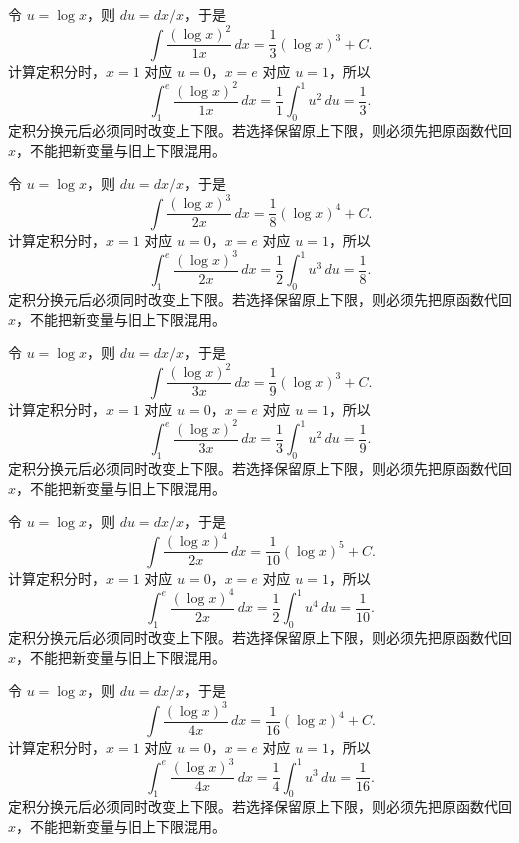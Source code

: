 \documentclass[UTF8,12pt,a4paper,fontset=fandol]{ctexart}
\begin{document}
\begin{solve}\label{ans:c12q19}
令 $u=\log x$，则 $du=dx/x$，于是
\[
\int\frac{(\log x)^{2}}{1x}\,dx=\frac{1}{3}(\log x)^{3}+C.
\]
计算定积分时，$x=1$ 对应 $u=0$，$x=e$ 对应 $u=1$，所以
\[
\int_1^e\frac{(\log x)^{2}}{1x}\,dx=\frac1{1}\int_0^1u^{2}\,du=\frac{1}{3}.
\]
定积分换元后必须同时改变上下限。若选择保留原上下限，则必须先把原函数代回 $x$，不能把新变量与旧上下限混用。
\end{solve}

\begin{solve}\label{ans:c12q20}
令 $u=\log x$，则 $du=dx/x$，于是
\[
\int\frac{(\log x)^{3}}{2x}\,dx=\frac{1}{8}(\log x)^{4}+C.
\]
计算定积分时，$x=1$ 对应 $u=0$，$x=e$ 对应 $u=1$，所以
\[
\int_1^e\frac{(\log x)^{3}}{2x}\,dx=\frac1{2}\int_0^1u^{3}\,du=\frac{1}{8}.
\]
定积分换元后必须同时改变上下限。若选择保留原上下限，则必须先把原函数代回 $x$，不能把新变量与旧上下限混用。
\end{solve}

\begin{solve}\label{ans:c12q21}
令 $u=\log x$，则 $du=dx/x$，于是
\[
\int\frac{(\log x)^{2}}{3x}\,dx=\frac{1}{9}(\log x)^{3}+C.
\]
计算定积分时，$x=1$ 对应 $u=0$，$x=e$ 对应 $u=1$，所以
\[
\int_1^e\frac{(\log x)^{2}}{3x}\,dx=\frac1{3}\int_0^1u^{2}\,du=\frac{1}{9}.
\]
定积分换元后必须同时改变上下限。若选择保留原上下限，则必须先把原函数代回 $x$，不能把新变量与旧上下限混用。
\end{solve}

\begin{solve}\label{ans:c12q22}
令 $u=\log x$，则 $du=dx/x$，于是
\[
\int\frac{(\log x)^{4}}{2x}\,dx=\frac{1}{10}(\log x)^{5}+C.
\]
计算定积分时，$x=1$ 对应 $u=0$，$x=e$ 对应 $u=1$，所以
\[
\int_1^e\frac{(\log x)^{4}}{2x}\,dx=\frac1{2}\int_0^1u^{4}\,du=\frac{1}{10}.
\]
定积分换元后必须同时改变上下限。若选择保留原上下限，则必须先把原函数代回 $x$，不能把新变量与旧上下限混用。
\end{solve}

\begin{solve}\label{ans:c12q23}
令 $u=\log x$，则 $du=dx/x$，于是
\[
\int\frac{(\log x)^{3}}{4x}\,dx=\frac{1}{16}(\log x)^{4}+C.
\]
计算定积分时，$x=1$ 对应 $u=0$，$x=e$ 对应 $u=1$，所以
\[
\int_1^e\frac{(\log x)^{3}}{4x}\,dx=\frac1{4}\int_0^1u^{3}\,du=\frac{1}{16}.
\]
定积分换元后必须同时改变上下限。若选择保留原上下限，则必须先把原函数代回 $x$，不能把新变量与旧上下限混用。
\end{solve}
\end{document}
